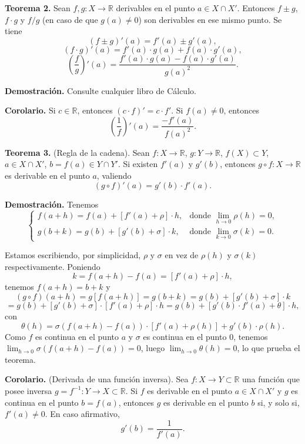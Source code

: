 \documentclass[12pt,oneside]{book}
\begin{document}
\textbf{Teorema 2.} Sean \( f, g: X \to \mathbb{R} \) derivables en el punto \( a \in X \cap X' \). Entonces \( f \pm g \), \( f \cdot g \) y \( f/g \) (en caso de que \( g(a) \neq 0 \)) son derivables en ese mismo punto. Se tiene
\[
(f \pm g)'(a) = f'(a) \pm g'(a),
\]
\[
(f \cdot g)'(a) = f'(a) \cdot g(a) + f(a) \cdot g'(a),
\]
\[
\left(\frac{f}{g}\right)'(a) = \frac{f'(a) \cdot g(a) - f(a) \cdot g'(a)}{g(a)^2}.
\]

\textbf{Demostración.} Consulte cualquier libro de Cálculo.

\textbf{Corolario.} Si \( c \in \mathbb{R} \), entonces \( (c \cdot f)' = c \cdot f' \). Si \( f(a) \neq 0 \), entonces
\[
\left(\frac{1}{f}\right)'(a) = \frac{-f'(a)}{f(a)^2}.
\]

\textbf{Teorema 3.} (Regla de la cadena). Sean \( f: X \to \mathbb{R} \), \( g: Y \to \mathbb{R} \), \( f(X) \subset Y \), \( a \in X \cap X' \), \( b = f(a) \in Y \cap Y' \). Si existen \( f'(a) \) y \( g'(b) \), entonces \( g \circ f: X \to \mathbb{R} \) es derivable en el punto \( a \), valiendo
\[
(g \circ f)'(a) = g'(b) \cdot f'(a).
\]

\textbf{Demostración.} Tenemos
\[
\begin{cases}
f(a + h) = f(a) + [f'(a) + \rho] \cdot h, & \text{donde } \lim_{h \to 0} \rho(h) = 0, \\
g(b + k) = g(b) + [g'(b) + \sigma] \cdot k, & \text{donde } \lim_{k \to 0} \sigma(k) = 0.
\end{cases}
\]

Estamos escribiendo, por simplicidad, \( \rho \) y \( \sigma \) en vez de \( \rho(h) \) y \( \sigma(k) \) respectivamente. Poniendo
\[
k = f(a + h) - f(a) = [f'(a) + \rho] \cdot h,
\]
tenemos \( f(a + h) = b + k \) y
\[
(g \circ f)(a + h) = g[f(a + h)] = g(b + k) = g(b) + [g'(b) + \sigma] \cdot k
\]
\[
= g(b) + [g'(b) + \sigma] \cdot [f'(a) + \rho] \cdot h
= g(b) + [g'(b) \cdot f'(a) + \theta] \cdot h,
\]
con
\[
\theta(h) = \sigma(f(a + h) - f(a)) \cdot [f'(a) + \rho(h)] + g'(b) \cdot \rho(h).
\]
Como \( f \) es continua en el punto \( a \) y \( \sigma \) es continua en el punto \( 0 \), tenemos \( \lim_{h \to 0} \sigma(f(a + h) - f(a)) = 0 \), luego \( \lim_{h \to 0} \theta(h) = 0 \), lo que prueba el teorema.

\textbf{Corolario.} (Derivada de una función inversa). Sea \( f: X \to Y \subset \mathbb{R} \) una función que posee inversa \( g = f^{-1}: Y \to X \subset \mathbb{R} \). Si \( f \) es derivable en el punto \( a \in X \cap X' \) y \( g \) es continua en el punto \( b = f(a) \), entonces \( g \) es derivable en el punto \( b \) si, y solo si, \( f'(a) \neq 0 \). En caso afirmativo,
\[
g'(b) = \frac{1}{f'(a)}.
\]
\end{document}
